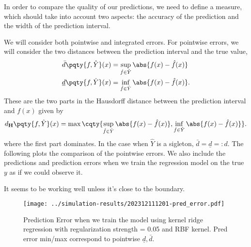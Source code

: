 \documentclass[12pt]{article}
\begin{document}
In order to compare the quality of our predictions, we need to define a measure, which should take into account two aspects: the accuracy of the prediction and the width of the prediction interval.

We will consider both pointwise and integrated errors. For pointwise errors, we will consider the two distances between the prediction interval and the true value,
\begin{align*}
    \bar{d}\pqty{f, \hat{Y}}(x)       & = \sup_{\hat{f} \in \hat{Y}} \abs{f(x) - \hat{f}(x)}  \\
    \underline{d}\pqty{f, \hat{Y}}(x) & = \inf_{\hat{f} \in \hat{Y}} \abs{f(x) - \hat{f}(x)}.
\end{align*}
These are the two parts in the Hausdorff distance between the prediction interval and \(f(x)\) given by
\begin{equation*}
    d_{\mathbf{H}}\pqty{f, \hat{Y}}(x) = \max\cqty{\sup_{\hat{f} \in \hat{Y}} \abs{f(x) - \hat{f}(x)}, \inf_{\hat{f} \in \hat{Y}} \abs{f(x) - \hat{f}(x)}}.
\end{equation*}
where the first part dominates. In the case when \(\hat{Y}\) is a sigleton, \(\bar{d} = \underline{d} = : d\). The following plots the comparison of the pointwise errors. We also include the predictions and prediction errors when we train the regression model on the true \(y\) as if we could observe it.

It seems to be working well unless it's close to the boundary.

\begin{figure}[ht]
    \centering
    \texttt{[image: ../simulation-results/202312111201-pred\_error.pdf]}
    \caption{Prediction Error when we train the model using kernel ridge regression with regularization strength = 0.05 and RBF kernel. Pred error min/max correspond to pointwise \(\underline{d}, \bar{d}\).}
    \label{fig:pred_error}
\end{figure}
\end{document}
